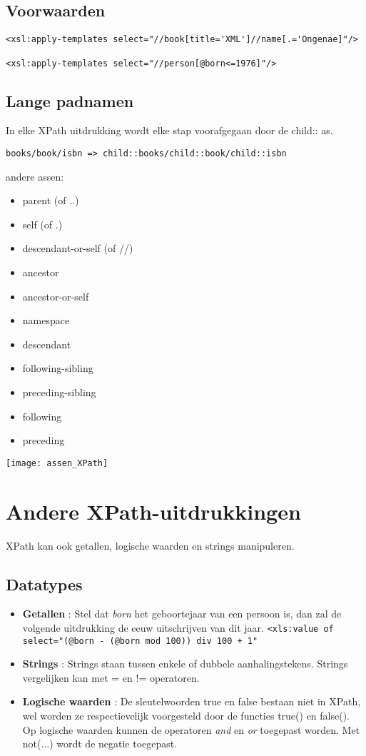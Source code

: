 \documentclass{report}
\begin{document}
	\subsection{Voorwaarden}
	\begin{lstlisting}
<xsl:apply-templates select="//book[title='XML']//name[.='Ongenae]"/>
	
<xsl:apply-templates select="//person[@born<=1976]"/>
	\end{lstlisting}
	\subsection{Lange padnamen}
	In elke XPath uitdrukking wordt elke stap voorafgegaan door de child:: as.
	
	\texttt{books/book/isbn => child::books/child::book/child::isbn}
	
	andere assen:
	\begin{itemize}
		\item parent (of ..)
		\item self (of .)
		\item descendant-or-self (of //)
		\item ancestor 
		\item ancestor-or-self
		\item namespace
		\item descendant
		\item following-sibling
		\item preceding-sibling
		\item following
		\item preceding
	\end{itemize}
	\texttt{[image: assen\_XPath]}
	
	\section{Andere XPath-uitdrukkingen}
	XPath kan ook getallen, logische waarden en strings manipuleren.
	\subsection{Datatypes}
	\begin{itemize}
		\item \textbf{Getallen} : Stel dat \textit{born} het geboortejaar van een persoon is, dan zal de volgende uitdrukking de eeuw uitschrijven van dit jaar.
		\texttt{<xls:value of select="(@born - (@born mod 100)) div 100 + 1"}
		
		\item \textbf{Strings} : Strings staan tussen enkele of dubbele aanhalingstekens. Strings vergelijken kan met = en != operatoren.
		
		\item \textbf{Logische waarden} : De sleutelwoorden true en false bestaan niet in XPath, wel worden ze respectievelijk voorgesteld door de functies true() en false(). Op logische waarden kunnen de operatoren \textit{and} en \textit{or} toegepast worden. Met not(...) wordt de negatie toegepast.
		
	\end{itemize}
\end{document}
